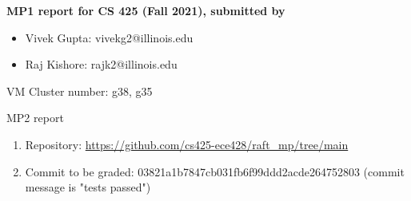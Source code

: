 \documentclass[11pt]{article}
\begin{document}
\noindent
{\bf MP1 report for CS 425 (Fall 2021), submitted by
\begin{itemize}
\item Vivek Gupta: vivekg2@illinois.edu
\item Raj Kishore: rajk2@illinois.edu
\end{itemize}
VM Cluster number: g38, g35
}

\noindent\hrulefill

\begin{description}
\item[MP2 report]
\end{description}

\begin{enumerate}

\item Repository: \url{https://github.com/cs425-ece428/raft_mp/tree/main}

\item Commit to be graded: 03821a1b7847cb031fb6f99ddd2acde264752803 (commit message is "tests passed")

\end{enumerate}
\end{document}
